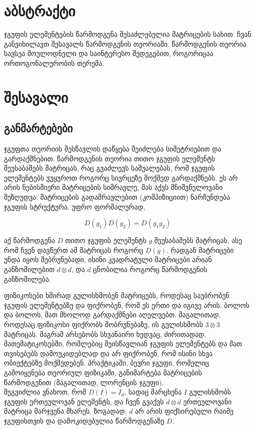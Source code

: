 \documentclass[12pt]{article}
\begin{document}
\begin{sloppypar}
\newpage
\section{აბსტრაქტი}
ჯგუფის ელემენტების წარმოდგენა შესაძლებელია მატრიცების სახით. ჩვან განვიხილავთ შესავალს წარმოდგენის თეორიაში. წარმოდგენის თეორია სავსეა მოულოდნელი და საინტერესო შედეგებით, როგორიცაა ორთოგონალურობის თერემა.

\section{შესავალი}

\subsection{განმარტებები}
ჯგუფთა თეორიის შესწავლის დაწყება შეიძლება სიმეტრიებით და გარდაქმნებით. წარმოდგენის თეორია თითო ჯგუფის ელემენტს შეუსაბამებს მატრიცას, რაც გვაძლევს საშუალებას, რომ ჯგუფის ელემენტებს ვუყუროთ როგორც სივრცეზე მოქმედ გარდაქმნებს. ეს არ არის ნებისმიერი მატრიცების სიმრავლე, მას აქვს მნიშვნელოვანი შეზღუდვა: მატრიცების გადამრავლებით (კომპიზიციით) ნარჩუნდება ჯგუფის სტრუქტურა. უფრო ფორმალურად,

\begin{equation} \label{Representation equation}
		D(g_1)D(g_2) = D(g_1 g_2)
\end{equation}
	
აქ წარმოდგენა $D$ თითო ჯგუფის ელემენტს $g$ შეუსაბამებს მატრიცას, ასე რომ ჩვენ დავწერთ ამ მატრიცას როგორც $D(g)$. რადგან მატრიცები უნდა იყოს შებრუნებადი, ისინი კვადრატული მატრიცები არიან განზომილებით $d \otimes d$, და $d$ ცნობილია როგორც წარმოდგენის განზომილება.


ფიზიკოსები ხშირად გულისხმობენ მატრიცებს, როდესაც საუბრობენ ჯგუფის ელემენტებზე და ფიქრობენ, რომ ეს ერთი და იგივე არის. ბოლოს და ბოლოს, მათ მხოლოდ გარდაქმნები აღელვებთ. მაგალითად, როდესაც ფიზიკოსი ფიქრობს მობრუნებაზე, ის გულისხმობს $3 \otimes 3$ მატრიცას. მაგრამ არსებობს სხვანაირი ხედვაც, ძირითადად, მათემატიკოსებში, რომლებიც შეისწავლიან ჯგუფის ელემენტებს და მათ თვისებებს დამოუკიდებლად და არ ფიქრობენ, რომ ისინი სხვა ობიექტებზე მოქმედებენ. პრაქტიკაში, ბევრი ჯგუფი, რომელიც გამოიყენება თეორიულ ფიზიკაში, განიმარტება მატრიცების წარმოდგენით (მაგალითად, ლორენცის ჯგუფი).\\


შეგვიძლია ვნახოთ, რომ $D(I) = I_d$, სადაც მარცხენა $I$ გულისხმობს ჯგუფის ერთეულოვან ელემენტს, და ჩვენ გვაქვს $d \otimes d$ ერთეულოვანი მატრიცა მარჯვენა მხარეს. ზოგადად, $d$ არ არის ფიქსირებული რაიმე ჯგუფისთვის და დამოკიდებულია წარმოდგენაზე $D$. 


\end{sloppypar}
\end{document}
